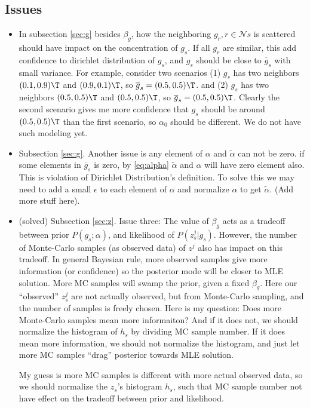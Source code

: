 \documentclass{article}
\begin{document}
\subsection{Issues}
\begin{itemize}
  \item In subsection \ref{sec:g} besides $\beta_g$, how the neighboring $g_r, r\in \mathcal{N}s$ is scattered should have impact on the concentration of $g_s$. If all $g_r$ are similar, this add confidence to dirichlet distribution of $g_s$, and $g_s$ should be close to $\overline{g}_s$ with small variance. For example, consider two scenarios (1) $g_s$ has two neighbors $(0.1, 0.9)\T$ and $(0.9, 0.1)\T$, so $\overline{g}_s = (0.5, 0.5)\T$. and (2) $g_s$ has two neighbors $(0.5, 0.5)\T$ and $(0.5, 0.5)\T$, so $\overline{g}_s = (0.5, 0.5)\T$. Clearly the second scenario gives me more confidence that $g_s$ should be around $(0.5, 0.5)\T$ than the first scenario, so $\alpha_0$ should be different. We do not have such modeling yet.\label{is:1}

  \item Subsection \ref{sec:g}. Another issue is any element of $\alpha$ and $\tilde \alpha$ can not be zero. if some elements in $\overline{g}_s$ is zero, by \eqref{eq:alpha} $\tilde \alpha$ and $\alpha$ will have zero element also. This is violation of Dirichlet Distribution's definition. To solve this we may need to add a small $\epsilon$ to each element of $\alpha$ and normalize $\alpha$ to get $\tilde \alpha$. (Add more stuff here).\label{is:2}

  \item (solved) Subsection \ref{sec:z}. Issue three: The value of $\beta_g$ acts as a tradeoff between prior $P(g_s; \alpha)$, and likelihood of $P(z_s^j | g_s)$. However, the number of Monte-Carlo samples (as observed data) of $z^j$ also has impact on this tradeoff. In general Bayesian rule, more observed samples give more information (or confidence) so the posterior mode  will be closer to MLE solution. More MC samples will swamp the prior, given a fixed $\beta_g$. Here our ``observed'' $z_s^j$ are not actually observed, but from Monte-Carlo sampling, and the number of samples is freely chosen. Here is my question: Does more Monte-Carlo samples mean more informaiton? And if it does not, we should normalize the histogram of $h_s$ by dividing MC sample number. If it does mean more information, we should not normalize the histogram, and just let more MC samples ``drag'' posterior towards MLE solution.

    My guess is more MC samples is different with more actual observed data, so we should normalize the $z_s$'s histogram $h_s$, such that MC sample number not have effect on the tradeoff between prior and likelihood.


\end{itemize}
\end{document}
